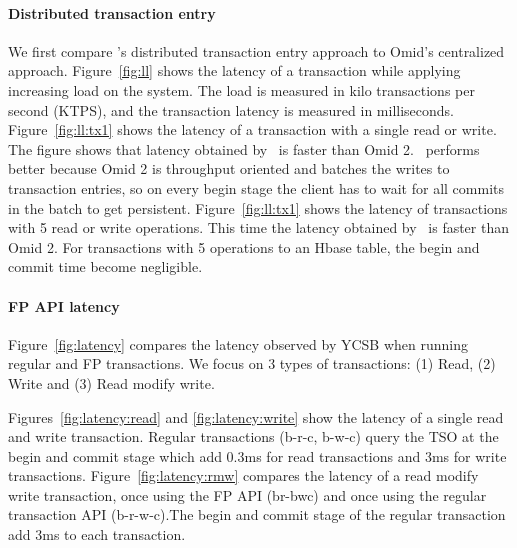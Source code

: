\paragraph{Distributed transaction entry}
We first compare \sys's distributed transaction entry approach to Omid's centralized approach. Figure~\ref{fig:ll} shows the latency of a transaction while applying increasing load on the system. The load is measured in kilo transactions per second (KTPS), and the transaction latency is measured in milliseconds. Figure~\ref{fig:ll:tx1} shows the latency of a transaction with a single read or write. The figure shows that latency obtained by \sys\ is  faster than Omid 2. \sys\ performs better because Omid 2 is throughput oriented and batches the writes to transaction entries, so on every begin stage the client has to wait for all commits in the batch to get persistent.
Figure~\ref{fig:ll:tx1} shows the latency of transactions with 5 read or write operations. This time the latency obtained by \sys\ is  faster than Omid 2. For transactions with 5 operations to an Hbase table, the begin and commit time become negligible.

\paragraph{FP API latency}
Figure~\ref{fig:latency} compares the latency observed by YCSB when running regular and FP transactions.
We focus on 3 types of transactions: (1) Read, (2) Write and (3) Read modify write.

Figures~\ref{fig:latency:read} and \ref{fig:latency:write} show the latency of a single read and write transaction. Regular transactions (b-r-c, b-w-c) query the TSO at the begin and commit stage which add 0.3ms for read transactions and 3ms for write transactions.
Figure~\ref{fig:latency:rmw} compares the latency of a read modify write transaction, once using the FP API (br-bwc) and once using the regular transaction API (b-r-w-c).The begin and commit stage of the regular transaction add 3ms to each transaction.







